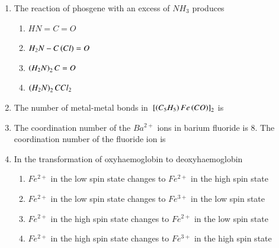 \documentclass[journal,12pt,onecolumn]{IEEEtran}
\theoremstyle{remark}
\begin{document}
\begin{enumerate}
\item The reaction of phosgene with an excess of $NH_3$ produces
    \begin{enumerate}
        \item $HN=C=O$
        \item $H_2N-C\left(Cl\right)=O$
        \item $\left(H_2N\right)_2C=O$
        \item $\left(H_2N\right)_2CCl_2$
        \hfill{}
    \end{enumerate}



\item The number of metal-metal bonds in ${}\left[\left(C_5H_5\right)Fe\left(CO\right)\right]_2$ is
    \begin{enumerate}
        \hfill{}
    \end{enumerate}



\item The coordination number of the $Ba^{2+}$ ions in barium fluoride is 8. The coordination number of the fluoride ion is
    \begin{enumerate}
        \hfill{}
    \end{enumerate}



\item In the transformation of oxyhaemoglobin to deoxyhaemoglobin
    \begin{enumerate}
        \item $Fe^{2+}$ in the low spin state changes to $Fe^{2+}$ in the high spin state
        \item $Fe^{2+}$ in the low spin state changes to $Fe^{3+}$ in the low spin state
        \item $Fe^{2+}$ in the 
 high spin state changes to $Fe^{2+}$ in the low spin state
        \item $Fe^{2+}$ in the high spin state changes to $Fe^{3+}$ in the high spin state
        \hfill{}
    \end{enumerate}




\end{enumerate}
\end{document}
